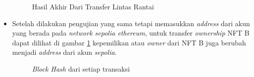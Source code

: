 \begin{itemize}
    \begin{figure} [H] \centering
    \caption{Hasil Akhir Dari Transfer Lintas Rantai}
    \label{fig:lintas_rantai}
    \end{figure}

    \item Setelah dilakukan pengujian yang sama tetapi memasukkan \emph{address} dari akun yang berada pada \emph{network sepolia ethereum}, untuk transfer \emph{ownership} NFT B dapat dilihat di gambar \ref*{fig:lintas_rantai} kepemilikan atau \emph{owner} dari NFT B juga berubah menjadi \emph{address} dari akun \emph{sepolia}. 
    
    \begin{figure} [H] \centering
      \caption{\emph{Block Hash} dari setiap transaksi}
      \label{fig:hash_block}
      \end{figure}


\end{itemize}
